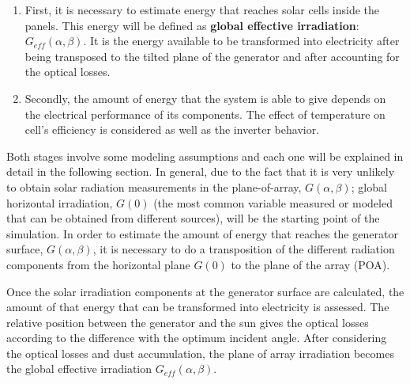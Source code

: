 \begin{enumerate}
\item First, it is necessary to estimate energy that reaches solar cells inside the panels. This energy will be defined as \textbf{global effective irradiation}: $G_{eff}(\alpha, \beta)$. It is the energy available to be transformed into electricity after being transposed to the tilted plane of the generator and after accounting for the optical losses.
  \item Secondly, the amount of energy that the system is able to give depends on the electrical performance of its components. The effect of temperature on cell's efficiency is considered as well as the inverter behavior.
  \end{enumerate}
  
Both stages involve some modeling assumptions and each one will be explained in detail in the following section. In general, due to the fact that it is very unlikely to obtain solar radiation measurements in the plane-of-array, $G(\alpha, \beta)$; global horizontal irradiation, $G(0)$ (the most common variable measured or modeled that can be obtained from different sources), will be the starting point of the simulation. In order to estimate the amount of energy that reaches the generator surface, $G(\alpha, \beta)$, it is necessary to do a transposition of the different radiation components from the horizontal plane $G(0)$ to the plane of the array (POA).


Once the solar irradiation components at the generator surface are calculated, the amount of that energy that can be transformed into electricity is assessed. The relative position between the generator and the sun gives the optical losses according to the difference with the optimum incident angle. After considering the optical losses and dust accumulation, the plane of array irradiation becomes the global effective irradiation $G_{eff}(\alpha, \beta)$.

